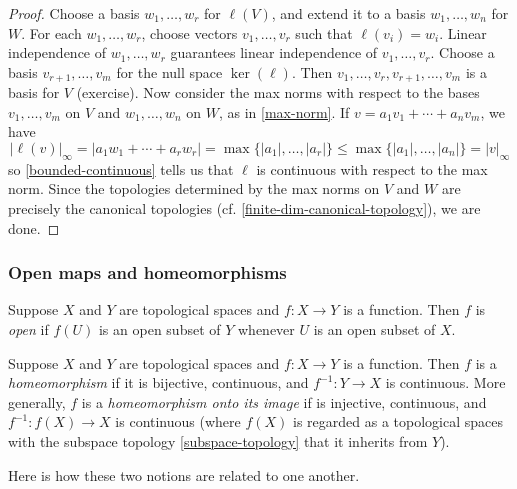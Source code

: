 \begin{proof}
	Choose a basis $w_1, \dotsc, w_r$ for $\ell(V)$, and extend it to a basis $w_1, \dotsc, w_n$ for $W$. For each $w_1, \dotsc, w_r$, choose vectors $v_1, \dotsc, v_r$ such that $\ell(v_i) = w_i$. Linear independence of $w_1, \dotsc, w_r$ guarantees linear independence of $v_1, \dotsc, v_r$. Choose a basis $v_{r+1}, \dotsc, v_m$ for the null space $\ker(\ell)$. Then $v_1, \dotsc, v_r, v_{r+1}, \dotsc, v_m$ is a basis for $V$ (exercise). Now consider the max norms with respect to the bases $v_1, \dotsc, v_m$ on $V$ and $w_1, \dotsc, w_n$ on $W$, as in \cref{max-norm}. If $v = a_1 v_1 + \dotsb + a_n v_m$, we have 
	\[ |\ell(v)|_\infty = |a_1w_1 + \dotsb + a_r w_r| = \max\{ |a_1|, \dotsc, |a_r| \} \leq \max\{ |a_1|, \dotsc, |a_n|\} =  |v|_\infty \]
	so \cref{bounded-continuous} tells us that $\ell$ is continuous with respect to the max norm. Since the topologies determined by the max norms on $V$ and $W$ are precisely the canonical topologies (cf. \cref{finite-dim-canonical-topology}), we are done.  
\end{proof}

\subsubsection*{Open maps and homeomorphisms}

\begin{definition}  \label{open-map-definition}
	Suppose $X$ and $Y$ are topological spaces and $f : X \to Y$ is a function. Then $f$ is \emph{open} if $f(U)$ is an open subset of $Y$ whenever $U$ is an open subset of $X$. 
\end{definition}

\begin{definition}[Homeomorphisms]   \label{homeomorphism-definition}
	Suppose $X$ and $Y$ are topological spaces and $f : X \to Y$ is a function. Then $f$ is a \emph{homeomorphism} if it is bijective, continuous, and $f^{-1} : Y \to X$ is continuous. More generally, $f$ is a \emph{homeomorphism onto its image} if is injective, continuous, and $f^{-1} : f(X) \to X$ is continuous (where $f(X)$ is regarded as a topological spaces with the subspace topology \ref{subspace-topology} that it inherits from $Y$). 
\end{definition}

Here is how these two notions are related to one another. 

